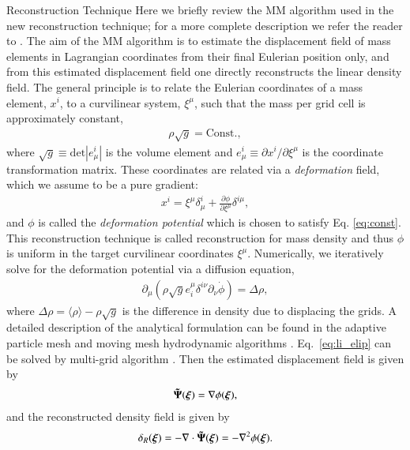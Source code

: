 \begin{section}{Reconstruction Technique}
  \label{sec:reconstruction}
  Here we briefly review the MM algorithm used in the new reconstruction technique; for a more
  complete description we refer the reader to \citealt{bib:ZhuH2016}.  
  The aim of the MM algorithm is to estimate the displacement field of mass elements in 
  Lagrangian coordinates from their final Eulerian position only, and from this
  estimated displacement field one directly reconstructs the linear density field. The
  general principle is to relate the Eulerian coordinates of a mass element, $x^i$, to
  a curvilinear system, $\xi^\mu$, such that the mass
  per grid cell is approximately constant,
  \begin{align}
   \label{eq:const}
    \rho \sqrt{g}=\mathrm{Const.},
  \end{align}
  where $\sqrt{g} \equiv \mathrm{det}\left| e^i_\mu\right|$ is the volume
  element and $e^i_\mu \equiv \partial x^i / \partial \xi ^ \mu$ is the coordinate transformation matrix. 
  These coordinates are
  related via a {\it deformation} field, which we assume to be a pure
  gradient:
  \begin{align}
    x^i = \xi^\mu \delta^i_\mu + \frac{\partial \phi}{\partial
    \xi^\mu}\delta^{i\mu},
  \end{align}
  and $\phi$ is called the {\it deformation potential} which is chosen to satisfy Eq. \ref{eq:const}.  
  This reconstruction technique is called  reconstruction for 
  mass density and thus $\phi$ is uniform in the target curvilinear coordinates $\xi^\mu$.
  Numerically, we iteratively solve for
  the deformation potential via a diffusion equation, 
  \begin{align}
    \label{eq:li_elip}
    \partial _\mu (\rho \sqrt{g} e^\mu _i \delta^{i\nu}
    \partial_\nu \dot{\phi})=\Delta \rho,
  \end{align}
  where $\Delta \rho = \langle\rho\rangle-\rho \sqrt{g}$ is the difference in density 
  due to displacing the grids. A detailed description 
  of the analytical formulation can be found in the adaptive
  particle mesh and moving mesh hydrodynamic algorithms \citep{bib:Pen1995,bib:Pen1998}.
  Eq.~\ref{eq:li_elip} can be solved by multi-grid
  algorithm \citep{bib:Pen1995,bib:Pen1998,bib:ZhuH2016}.
  Then the estimated displacement field is given by
  \begin{align}
   \label{eq:disp}
   \boldsymbol{\tilde{\Psi}}(\boldsymbol{\xi})=\nabla \phi(\boldsymbol{\xi}),
  \end{align}
  and the reconstructed density field is given by
  \begin{align}
   \label{eq:delta}
   \delta_R(\boldsymbol{\xi})=- \nabla \cdot \boldsymbol{\tilde{\Psi}}(\boldsymbol{\xi}) = - \nabla^2 \phi(\boldsymbol{\xi}). 
  \end{align}

\end{section}

